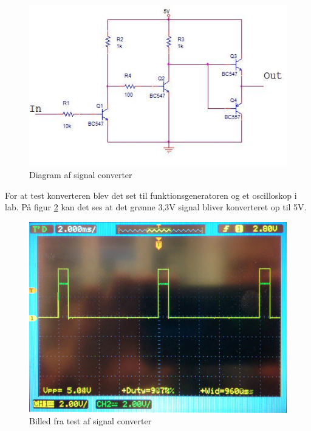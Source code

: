\begin{figure}[h]
	\centering
	\includegraphics[width=\textwidth* 7/10]{../fig/billeder/servo_stepup}
	\caption{Diagram af signal converter}
	\label{fig:signal_converter}
\end{figure}  
\clearpage
For at test konverteren blev det set til funktionsgeneratoren og et oscilloskop i lab. På figur \ref{fig:test_signal_converter} kan det ses at det grønne 3,3V signal bliver konverteret op til 5V. 
\begin{figure}[h]
	\centering
	\includegraphics[width=\textwidth* 7/10]{../fig/billeder/converter_test}
	\caption{Billed fra test af signal converter}
	\label{fig:test_signal_converter}
\end{figure}  
